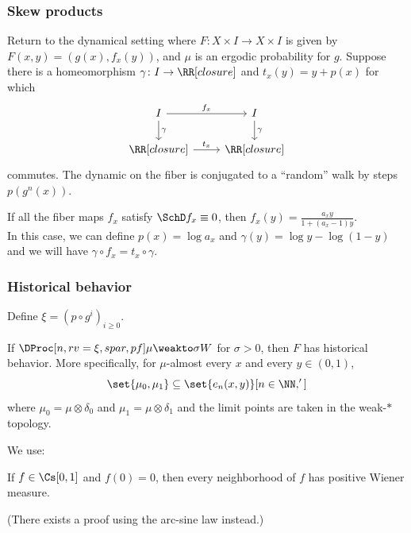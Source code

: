 \documentclass[shortlabels, 9pt, aspectratio=2013]{beamer}
\begin{document}
\begin{frame}[fragile]
  \frametitle{Skew products}
  Return to the dynamical setting where \(F \colon X \times I \to X \times I\) is given by \(F(x,y) = (g(x),f_x(y))\), and \(\mu\) is an ergodic probability for \(g\). Suppose there is a homeomorphism \(\gamma \colon I \to \RR[closure]\) and \(t_x(y) = y + p(x)\) for which
  \[
    \begin{tikzcd}
      I \arrow[d, "\gamma"]\arrow[r, "f_{x}"] & I \arrow[d, "\gamma"]\\
      \RR[closure] \arrow[r,"t_{x}"] & \RR[closure]
    \end{tikzcd}
  \]
  commutes. The dynamic on the fiber is conjugated to a ``random'' walk by steps \(p(g^n(x))\).

  \begin{example}
    If all the fiber maps \(f_x\) satisfy \(\SchD f_x \equiv 0\), then \(f_x(y) = \frac{a_x y}{1 + (a_x - 1)y}\).\\[1em]

    In this case, we can define \(p(x) = \log a_x\) and \(\gamma(y) = \log y - \log (1 - y)\) and we will have \(\gamma \circ f_x = t_x \circ \gamma\).
  \end{example}
\end{frame}

\begin{frame}
  \frametitle{Historical behavior}
  Define \(\xi = (p \circ g^{i})_{i \geq 0}\).
  \begin{theorem}\label{thm:wip-historical}
    If \(\DProc[n,rv = \xi,spar,pf]\mu \weakto \sigma W\) for \(\sigma > 0\), then \(F\) has historical behavior. More specifically, for \(\mu\)-almost every \(x\) and every \(y \in (0,1)\),
    \begin{equation*}\label{eq:emp-closure}
      \set{\mu_0, \mu_1} \subseteq \set{e_n(x,y)}[n \in \NN, ']
    \end{equation*}
    where \(\mu_0 = \mu \otimes \delta_{0}\) and \(\mu_1 = \mu \otimes \delta_{1}\) and the limit points are taken in the weak-\(\ast\) topology.
  \end{theorem}
  We use:
  \begin{lemma}\label{thm:forgery}
    If \(f \in \CWPS\) and \(f(0) = 0\), then every neighborhood of \(f\) has positive Wiener measure.
  \end{lemma}
  (There exists a proof using the arc-sine law instead.)
\end{frame}
\end{document}
